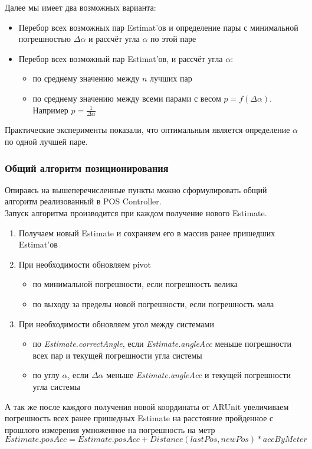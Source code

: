 \documentclass[a4paper, 11pt, titlepage]{article}
\begin{document}
          Далее мы имеет два возможных варианта:
          \begin{itemize}
            \item Перебор всех возможных пар Estimat'ов и определение пары с минимальной погрешностью $\Delta\alpha$ и рассчёт угла $\alpha$ по этой паре
            \item Перебор всех возможный пар Estimat'ов, и рассчёт угла $\alpha$:
            \begin{itemize}
              \item по среднему значению между $n$ лучших пар 
              \item по среднему значению между всеми парами с весом $p = f(\Delta\alpha)$. Например $p = \frac{1}{\Delta\alpha}$
            \end{itemize}
          \end{itemize}

          Практические эксперименты показали, что оптимальным является определение $\alpha$ по одной лучшей паре.

        \subsubsection{Общий алгоритм позиционирования}
          Опираясь на вышеперечисленные пункты можно сформулировать общий алгоритм реализованный в POS Controller.\\
          Запуск алгоритма производится при каждом получение нового Estimate.
          \begin{enumerate}
            \item Получаем новый Estimate и сохраняем его в массив ранее пришедших Estimat'ов
            \item При необходимости обновляем pivot
              \begin{itemize}
                \item по минимальной погрешности, если погрешность велика
                \item по выходу за пределы новой погрешности, если погрешность мала
              \end{itemize}
            \item При необходимости обновляем угол между системами
              \begin{itemize}
                \item по \textit{Estimate.correctAngle}, если \textit{Estimate.angleAcc} меньше погрешности всех пар и текущей погрешности угла системы 
                \item по углу $\alpha$, если $\Delta\alpha$ меньше \textit{Estimate.angleAcc} и текущей погрешности угла системы  
              \end{itemize}
          \end{enumerate}
          А так же после каждого получения новой координаты от ARUnit увеличиваем погрешность всех ранее пришедных Estimate на
          расстояние пройденное с прошлого измерения умноженное на погрешность на метр 
          $Estimate.posAcc = Estimate.posAcc + Distance(lastPos, newPos) * accByMeter$
\end{document}
